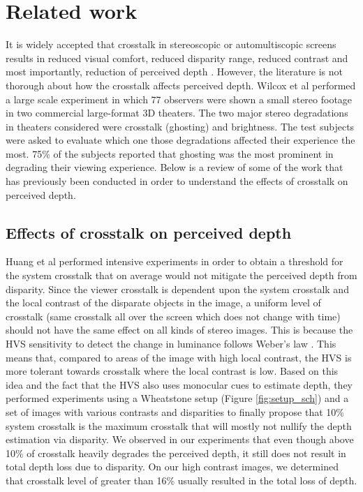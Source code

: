 \chapter{Related work}
\label{chap:relatedWork}
It is widely accepted that crosstalk in stereoscopic or automultiscopic screens results in reduced visual comfort, reduced disparity range, reduced contrast and most importantly, reduction of perceived depth \cite{woods2012crosstalk}\cite{wilcox2003determinants}\cite{tsirlin2012crosstalk}. However, the literature is not thorough about how the crosstalk affects perceived depth. Wilcox et al\cite{wilcox2003determinants} performed a large scale experiment in which 77 observers were shown a small stereo footage in two commercial large-format 3D theaters. The two major stereo degradations in theaters considered were crosstalk (ghosting) and brightness. The test subjects were asked to evaluate which one those degradations affected their experience the most. 75\% of the subjects reported that ghosting was the most prominent in degrading their viewing experience. Below is a review of some of the work that has previously been conducted in order to understand the effects of crosstalk on perceived depth.

\section{Effects of crosstalk on perceived depth}
Huang et al\cite{huang2003crosstalk} performed intensive experiments in order to obtain a threshold for the system crosstalk that on average would not mitigate the perceived depth from disparity. Since the viewer crosstalk is dependent upon the system crosstalk and the local contrast of the disparate objects in the image, a uniform level of crosstalk (same crosstalk all over the screen which does not change with time) should not have the same effect on all kinds of stereo images. This is because the HVS sensitivity to detect the change in luminance follows Weber's law \cite{webber}. This means that, compared to areas of the image with high local contrast, the HVS is more tolerant towards crosstalk where the local contrast is low. Based on this idea and the fact that the HVS also uses monocular cues to estimate depth, they performed experiments using a Wheatstone setup (Figure \ref{fig:setup_sch}) and a set of images with various contrasts and disparities to finally propose that 10\% system crosstalk is the maximum crosstalk that will mostly not nullify the depth estimation via disparity. We observed in our experiments that even though above 10\% of crosstalk heavily degrades the perceived depth, it still does not result in total depth loss due to disparity. On our high contrast images, we determined that crosstalk level of greater than 16\% usually resulted in the total loss of depth.

